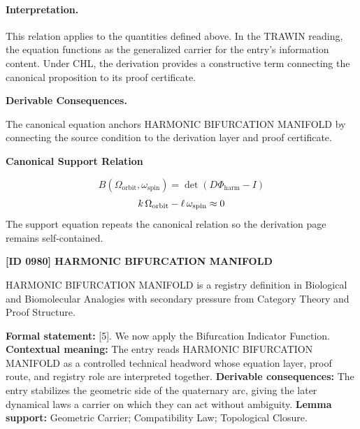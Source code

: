 \paragraph{Interpretation.}
This relation applies to the quantities defined above. In the TRAWIN reading, the equation functions as the generalized carrier for the entry’s information content. Under CHL, the derivation provides a constructive term connecting the canonical proposition to its proof certificate.

\par\vspace{0.35em}
\noindent\textbf{Derivable Consequences.}\quad
\begingroup
\footnotesize
\raggedright
The canonical equation anchors HARMONIC BIFURCATION MANIFOLD by connecting the source condition to the derivation layer and proof certificate.
\par\endgroup

\noindent\textbf{Canonical Support Relation}\par
\[
B(\Omega_{\mathrm{orbit}},\omega_{\mathrm{spin}})=
\det\!\left(D\Phi_{\mathrm{harm}}-I\right)
\]
\[
k\,\Omega_{\rm orbit}-\ell\,\omega_{\rm spin}\approx 0
\]
\noindent The support equation repeats the canonical relation so the derivation page remains self-contained.\par

\clearpage
\noindent\textbf{[ID 0980] HARMONIC BIFURCATION MANIFOLD}\par
\vspace{0.35em}
\begingroup\small
{}
HARMONIC BIFURCATION MANIFOLD is a registry definition in Biological and Biomolecular Analogies with secondary pressure from Category Theory and Proof Structure.

\begingroup\footnotesize\setlength{\emergencystretch}{3em}\sloppy
\textbf{Formal statement:} [5]. We now apply the Bifurcation Indicator Function. \textbf{Contextual meaning:} The entry reads HARMONIC BIFURCATION MANIFOLD as a controlled technical headword whose equation layer, proof route, and registry role are interpreted together. \textbf{Derivable consequences:} The entry stabilizes the geometric side of the quaternary arc, giving the later dynamical laws a carrier on which they can act without ambiguity. \textbf{Lemma support:} Geometric Carrier; Compatibility Law; Topological Closure.\par
\endgroup

